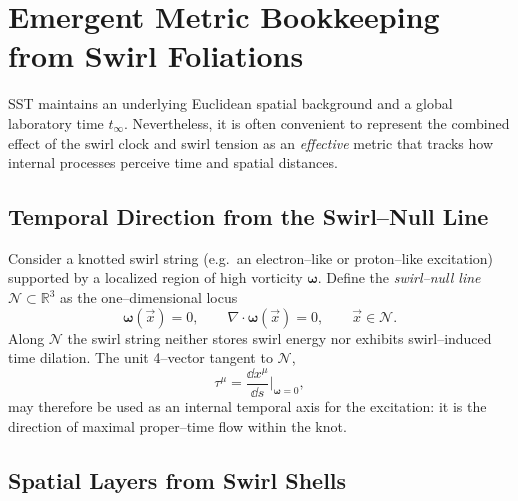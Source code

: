 \documentclass[11pt]{article}
\begin{document}
    \section{Emergent Metric Bookkeeping from Swirl Foliations}
    \label{sec:sst_spacetime_emergence}

    SST maintains an underlying Euclidean spatial background and a global laboratory time \(t_\infty\). Nevertheless, it is often convenient to represent the combined effect of the swirl clock and swirl tension as an \emph{effective} metric that tracks how internal processes perceive time and spatial distances.

    \subsection{Temporal Direction from the Swirl–Null Line}
        \label{subsec:sst_null_filament_time}

        Consider a knotted swirl string (e.g.~an electron–like or proton–like excitation) supported by a localized region of high vorticity \(\boldsymbol{\omega}\). Define the \emph{swirl–null line} \(\mathcal{N}\subset\mathbb{R}^3\) as the one–dimensional locus
        \begin{equation}
            \boldsymbol{\omega}(\vec{x})=0,
            \qquad
            \nabla\!\cdot\!\boldsymbol{\omega}(\vec{x})=0,
            \qquad
            \vec{x}\in\mathcal{N}.
        \end{equation}
        Along \(\mathcal{N}\) the swirl string neither stores swirl energy nor exhibits swirl–induced time dilation. The unit 4–vector tangent to \(\mathcal{N}\),
        \begin{equation}
            \tau^\mu
            =
            \frac{\dd x^\mu}{\dd s}\Big|_{\boldsymbol{\omega}=0},
        \end{equation}
        may therefore be used as an internal temporal axis for the excitation: it is the direction of maximal proper–time flow within the knot.

    \subsection{Spatial Layers from Swirl Shells}
        \label{subsec:sst_swirl_shells_space}
\end{document}
